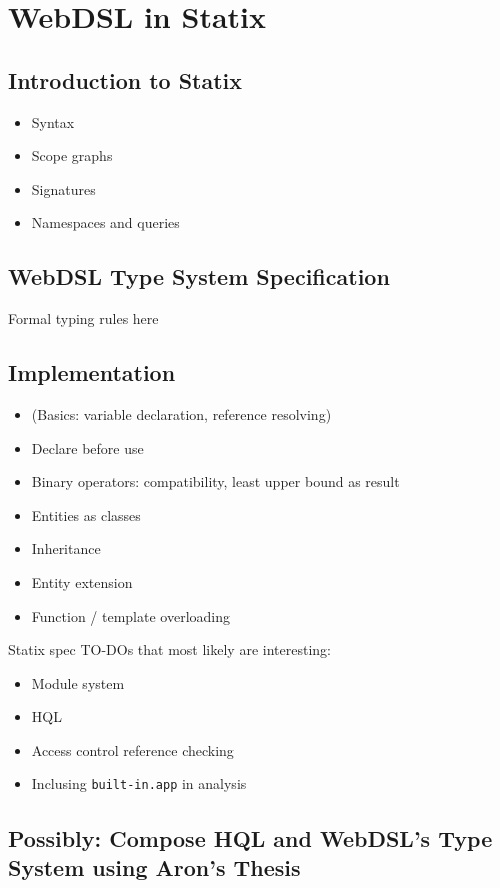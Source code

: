 
\chapter{\label{chap:statix}WebDSL in Statix}

  \section{Introduction to Statix}

    \begin{itemize}
      \item Syntax
      \item Scope graphs
      \item Signatures
      \item Namespaces and queries
    \end{itemize}
  
  \section{WebDSL Type System Specification}

    Formal typing rules here

  \section{Implementation}

    \begin{itemize}
      \item (Basics: variable declaration, reference resolving)
      \item Declare before use
      \item Binary operators: compatibility, least upper bound as result
      \item Entities as classes
      \item Inheritance
      \item Entity extension
      \item Function / template overloading
    \end{itemize}
  
    Statix spec TO-DOs that most likely are interesting:
    \begin{itemize}
      \item Module system
      \item HQL
      \item Access control reference checking
      \item Inclusing \texttt{built-in.app} in analysis
    \end{itemize}

  \section{Possibly: Compose HQL and WebDSL's Type System using Aron's Thesis}
